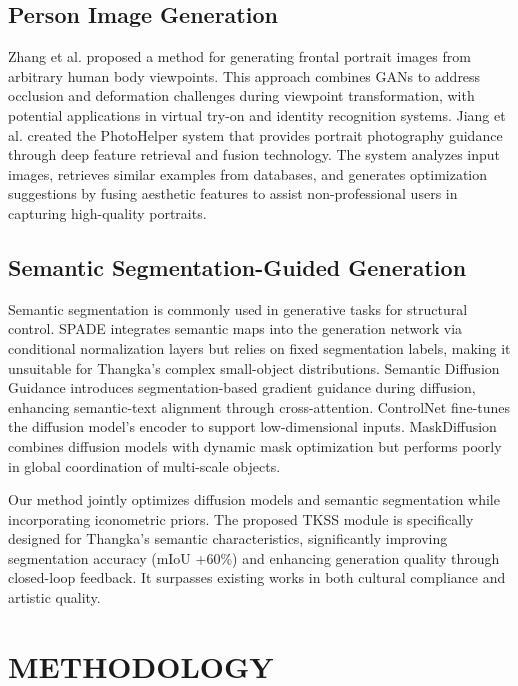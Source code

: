 \documentclass[sn-mathphys]{sn-jnl}%
\theoremstyle{thmstyleone}%
\theoremstyle{thmstyletwo}%
\theoremstyle{thmstylethree}%
\begin{document}
\subsection{Person Image Generation}
Zhang et al.\cite{b27} proposed a method for generating frontal portrait images from arbitrary human body viewpoints. This approach combines GANs to address occlusion and deformation challenges during viewpoint transformation, with potential applications in virtual try-on and identity recognition systems. Jiang et al.\cite{b28} created the PhotoHelper system that provides portrait photography guidance through deep feature retrieval and fusion technology. The system analyzes input images, retrieves similar examples from databases, and generates optimization suggestions by fusing aesthetic features to assist non-professional users in capturing high-quality portraits.

\subsection{Semantic Segmentation-Guided Generation}
Semantic segmentation is commonly used in generative tasks for structural control. SPADE \cite{b14} integrates semantic maps into the generation network via conditional normalization layers but relies on fixed segmentation labels, making it unsuitable for Thangka's complex small-object distributions. Semantic Diffusion Guidance \cite{b29} introduces segmentation-based gradient guidance during diffusion, enhancing semantic-text alignment through cross-attention. ControlNet \cite{b25} fine-tunes the diffusion model's encoder to support low-dimensional inputs. MaskDiffusion \cite{b30} combines diffusion models with dynamic mask optimization but performs poorly in global coordination of multi-scale objects.

Our method jointly optimizes diffusion models and semantic segmentation while incorporating iconometric priors. The proposed TKSS module is specifically designed for Thangka's semantic characteristics, significantly improving segmentation accuracy (mIoU +60\%) and enhancing generation quality through closed-loop feedback. It surpasses existing works in both cultural compliance and artistic quality.

\section{METHODOLOGY}
\end{document}
